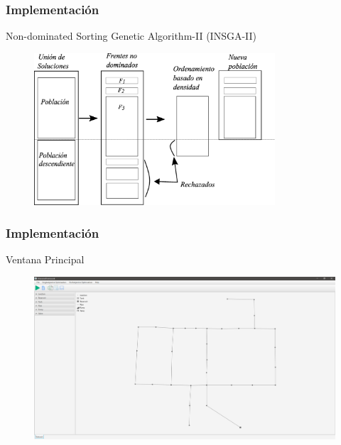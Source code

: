 \documentclass[9pt]{beamer}
\begin{document}

    \begin{frame}
        \frametitle{Implementación}                       
        Non-dominated Sorting Genetic Algorithm-II (INSGA-II)

        \begin{figure}
            \includegraphics[width=0.8\textwidth]{assets/NSGAII.eps}
        \end{figure}

    \end{frame}

    \begin{frame}
        \frametitle{Implementación}
        Ventana Principal                   
        \begin{figure}
            \includegraphics[width=\textwidth]{assets/Interfaces/Principal.png}
        \end{figure}
    \end{frame}
    
\end{document}
